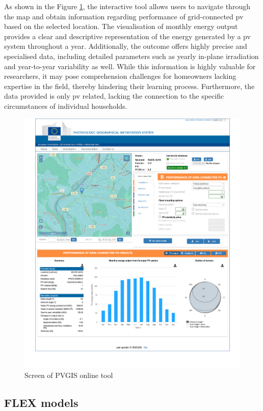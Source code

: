 As shown in the Figure \ref{fig:pvgis}, the interactive tool allows users to navigate through the map and obtain information regarding performance of grid-connected \gls{pv} based on the selected location. 
The visualisation of monthly energy output provides a clear and descriptive representation of the energy generated by a \gls{pv} system throughout a year. 
Additionally, the outcome offers highly precise and specialised data, including detailed parameters such as yearly in-plane irradiation and year-to-year variability as well. 
While this information is highly valuable for researchers, it may pose comprehension challenges for homeowners lacking expertise in the field, thereby hindering their learning process. 
Furthermore, the data provided is only \gls{pv} related, lacking the connection to the specific circumstances of individual households. 
\begin{figure}[h!]
  \centering
  \includegraphics[width=\textwidth]{Images/pvgis.png}
  \caption{Screen of PVGIS online tool}
  \label{fig:pvgis}
\end{figure}

\subsection{FLEX models}


